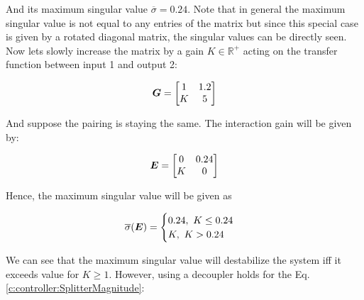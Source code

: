 And its maximum singular value $\overline{\sigma} = 0.24$. Note that in general the maximum singular value is not equal to any entries of the matrix but since this special case is given by a rotated diagonal matrix, the singular values can be directly seen. Now lets slowly increase the matrix by a gain $K \in \mathbb{R}^+$ acting on the transfer function between input 1 and output 2:

\begin{align*}
\mbox{\boldmath$G$} = \begin{bmatrix}
1 & 1.2 \\
K & 5
\end{bmatrix}
\end{align*}

And suppose the pairing is staying the same. The interaction gain will be given by:

\begin{align*}
\mbox{\boldmath$E$} = \begin{bmatrix}
0 & 0.24 \\
K & 0 \\
\end{bmatrix}
\end{align*}

Hence, the maximum singular value will be given as

\begin{align*}
\overline{\sigma}(\mbox{\boldmath$E$}) = \begin{cases}
0.24 , ~K \leq 0.24 \\
K, ~K > 0.24
\end{cases}
\end{align*}

We can see that the maximum singular value will destabilize the system iff it exceeds value for $K \geq 1$. However, using a decoupler holds for the Eq.\ref{c:controller:SplitterMagnitude}:

